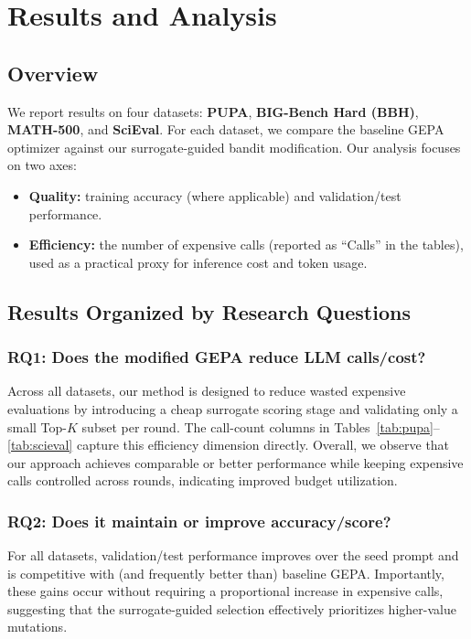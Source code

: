 \chapter{Results and Analysis}
\label{ch:results}

\section{Overview}
We report results on four datasets: \textbf{PUPA}, \textbf{BIG-Bench Hard (BBH)}, \textbf{MATH-500}, and \textbf{SciEval}. For each dataset, we compare the baseline GEPA optimizer against our surrogate-guided bandit modification. Our analysis focuses on two axes:
\begin{itemize}
    \item \textbf{Quality:} training accuracy (where applicable) and validation/test performance.
    \item \textbf{Efficiency:} the number of expensive calls (reported as ``Calls'' in the tables), used as a practical proxy for inference cost and token usage.
\end{itemize}

\section{Results Organized by Research Questions}

\subsection*{RQ1: Does the modified GEPA reduce LLM calls/cost?}
Across all datasets, our method is designed to reduce wasted expensive evaluations by introducing a cheap surrogate scoring stage and validating only a small Top-$K$ subset per round. The call-count columns in Tables~\ref{tab:pupa}--\ref{tab:scieval} capture this efficiency dimension directly. Overall, we observe that our approach achieves comparable or better performance while keeping expensive calls controlled across rounds, indicating improved budget utilization.

\subsection*{RQ2: Does it maintain or improve accuracy/score?}
For all datasets, validation/test performance improves over the seed prompt and is competitive with (and frequently better than) baseline GEPA. Importantly, these gains occur without requiring a proportional increase in expensive calls, suggesting that the surrogate-guided selection effectively prioritizes higher-value mutations.

